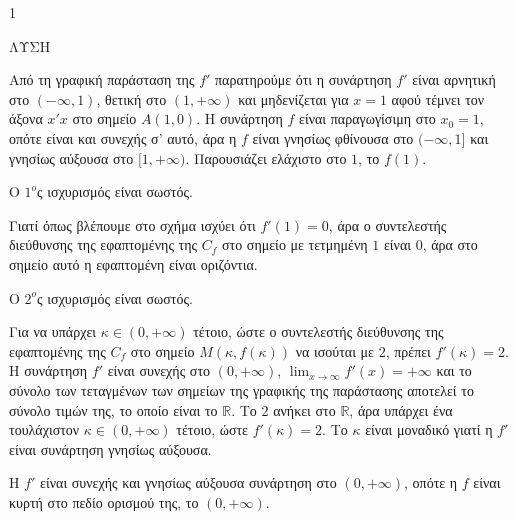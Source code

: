 \begin{ylh}{1}
    \item [Ύλη από εικόνα]
\end{ylh}
ΛΥΣΗ
\begin{alist}
\item Από τη γραφική παράσταση της $f'$ παρατηρούμε ότι η συνάρτηση $f'$ είναι αρνητική στο $(-\infty, 1)$, θετική στο $(1,+\infty)$ και μηδενίζεται για $x=1$ αφού τέμνει τον άξονα $x'x$ στο σημείο $A(1,0)$. Η συνάρτηση $f$ είναι παραγωγίσιμη στο $x_0=1$, οπότε είναι και συνεχής σ' αυτό, άρα η $f$ είναι γνησίως φθίνουσα στο $(-\infty,1]$ και γνησίως αύξουσα στο $[1,+\infty)$. Παρουσιάζει ελάχιστο στο $1$, το $f(1)$.
\item Ο $1^o{}$ς ισχυρισμός είναι σωστός.

Γιατί όπως βλέπουμε στο σχήμα ισχύει ότι $f'(1)=0$, άρα ο συντελεστής διεύθυνσης της εφαπτομένης της $C_f$ στο σημείο με τετμημένη $1$ είναι $0$, άρα στο σημείο αυτό η εφαπτομένη είναι οριζόντια.

Ο $2^o{}$ς ισχυρισμός είναι σωστός.

Για να υπάρχει $\kappa \in (0,+\infty)$ τέτοιο, ώστε ο συντελεστής διεύθυνσης της εφαπτομένης της $C_f$ στο σημείο $M(\kappa, f(\kappa))$ να ισούται με $2$, πρέπει $f'(\kappa) = 2$. Η συνάρτηση $f'$ είναι συνεχής στο $(0,+\infty)$, $\lim_{x\to\infty} f'(x) = +\infty$ και το σύνολο των τεταγμένων των σημείων της γραφικής της παράστασης αποτελεί το σύνολο τιμών της, το οποίο είναι το $\mathbb{R}$. Το $2$ ανήκει στο $\mathbb{R}$, άρα υπάρχει ένα τουλάχιστον $\kappa \in (0,+\infty)$ τέτοιο, ώστε $f'(\kappa) = 2$. Το $\kappa$ είναι μοναδικό γιατί η $f'$ είναι συνάρτηση γνησίως αύξουσα.
\item Η $f'$ είναι συνεχής και γνησίως αύξουσα συνάρτηση στο $(0,+\infty)$, οπότε η $f$ είναι κυρτή στο πεδίο ορισμού της, το $(0,+\infty)$.
\end{alist}